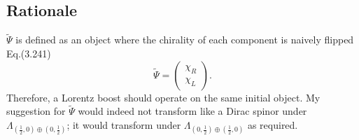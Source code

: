 \documentclass[11pt]{article}
\numberwithin{equation}{section}
\begin{document}
\subsection{Rationale}
$\tilde{\Psi}$ is defined as an object where the chirality of each component is naively flipped Eq.(3.241)
\begin{equation}
\tilde{\Psi} = \begin{pmatrix}
\chi_R \\
\chi_L
\end{pmatrix}.
\end{equation}
\noindent Therefore, a Lorentz boost should operate on the same initial object. My suggestion for $\tilde{\Psi}$ would indeed not transform like a Dirac spinor under $\Lambda_{(\frac{1}{2},0) \oplus (0, \frac{1}{2})}$; it would transform under $\Lambda_{(0, \frac{1}{2}) \oplus (\frac{1}{2}, 0)}$ as required. 

\newpage
\end{document}

